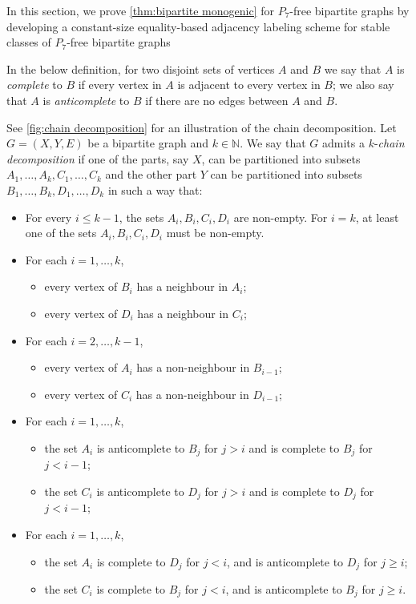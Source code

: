 \documentclass{article}
\newcommand{\bN}{\ensuremath{\mathbb{N}}}
\newcommand{\decomp}{chain\xspace}
\begin{document}
In this section, we prove \cref{thm:bipartite monogenic} for $P_7$-free bipartite graphs
by developing a constant-size equality-based adjacency labeling scheme for stable classes of $P_7$-free bipartite graphs 

In the below definition, for two disjoint sets of vertices $A$ and $B$ we say 
that $A$ is \emph{complete} to $B$ if every vertex in $A$ is adjacent to every vertex in $B$; we also say that $A$ is  \emph{anticomplete} to $B$ if there are no edges between $A$ and $B$.

\begin{definition}
\label{def: chain decomp}
See \cref{fig:chain decomposition} for an illustration of the chain decomposition.
Let $G=(X,Y,E)$ be a bipartite graph and $k \in \bN$.  We say that $G$ admits a $k$-\textit{\decomp
decomposition} if one of the parts, say $X$, can be partitioned into subsets $A_1, \ldots, A_k, C_1,
\ldots, C_k$ and the other part $Y$ can be partitioned into subsets $B_1, \ldots, B_k, D_1, \ldots,
D_k$ in such a way that:
	\begin{itemize}
		\item For every $i \leq k-1$, the sets $A_i, B_i,C_i,D_i$ are non-empty. For $i=k$, at least one of the sets $A_i, B_i,C_i,D_i$ must be non-empty.
		\item For each $i =1, \ldots, k$, 
		\begin{itemize}
			\item every vertex of $B_i$ has a neighbour in $A_i$; 
			\item every vertex of $D_i$ has a neighbour in $C_i$;
		\end{itemize}
		\item For each $i = 2, \ldots, k-1$, 
		\begin{itemize}
			\item every vertex of  $A_i$ has a non-neighbour in $B_{i-1}$;
			\item	every vertex of $C_i$ has a non-neighbour in $D_{i-1}$;
		\end{itemize}		
		\item For each $i = 1, \ldots, k$, 
		\begin{itemize}
			\item the set $A_i$ is anticomplete to $B_j$ for $j > i$ and
			is complete to $B_j$ for $j < i-1$; 
			\item the set $C_i$ is anticomplete to $D_j$ for $j > i$ and
			is complete to $D_j$ for $j < i-1$;
		\end{itemize}
		\item For each $i = 1, \ldots, k$, 
		\begin{itemize}
			\item the set $A_i$ is complete to $D_j$ for $j < i$, and is anticomplete to
			$D_j$ for $j \geq i$; 
			\item	the set $C_i$ is complete to $B_j$ for $j < i$, and is anticomplete to $B_j$ for $j \geq i$.
		\end{itemize}
	\end{itemize}
\end{definition}
\end{document}
